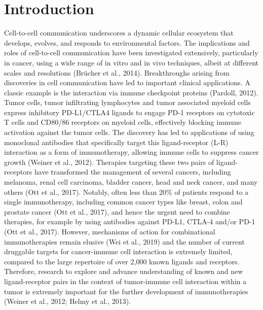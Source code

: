 \section{Introduction}
\label{Sec:2.1_intro}	%
Cell-to-cell communication underscores a dynamic cellular ecosystem that develops, evolves, and responds to environmental factors. The implications and roles of cell-to-cell communication have been investigated extensively, particularly in cancer, using a wide range of in vitro and in vivo techniques, albeit at different scales and resolutions (Brücher et al., 2014). Breakthroughs arising from discoveries in cell communication have led to important clinical applications. A classic example is the interaction via immune checkpoint proteins (Pardoll, 2012). Tumor cells, tumor infiltrating lymphocytes and tumor associated myeloid cells express inhibitory PD-L1/CTLA4 ligands to engage PD-1 receptors on cytotoxic T cells and CD80/86 receptors on myeloid cells, effectively blocking immune activation against the tumor cells. The discovery has led to applications of using monoclonal antibodies that specifically target this ligand-receptor (L-R) interaction as a form of immunotherapy, allowing immune cells to suppress cancer growth (Weiner et al., 2012). Therapies targeting these two pairs of ligand-receptors have transformed the management of several cancers, including melanoma, renal cell carcinoma, bladder cancer, head and neck cancer, and many others (Ott et al., 2017). Notably, often less than 20\% of patients respond to a single immunotherapy, including common cancer types like breast, colon and prostate cancer (Ott et al., 2017), and hence the urgent need to combine therapies, for example by using antibodies against PD-L1, CTLA-4 and/or PD-1  (Ott et al., 2017). However, mechanisms of action for combinational immunotherapies remain elusive (Wei et al., 2019) and the number of current druggable targets for cancer-immune cell interaction is extremely limited, compared to the large repertoire of over 2,000 known ligands and receptors. Therefore, research to explore and advance understanding of known and new ligand-receptor pairs in the context of tumor-immune cell interaction within a tumor is extremely important for the further development of immunotherapies (Weiner et al., 2012; Helmy et al., 2013). 

